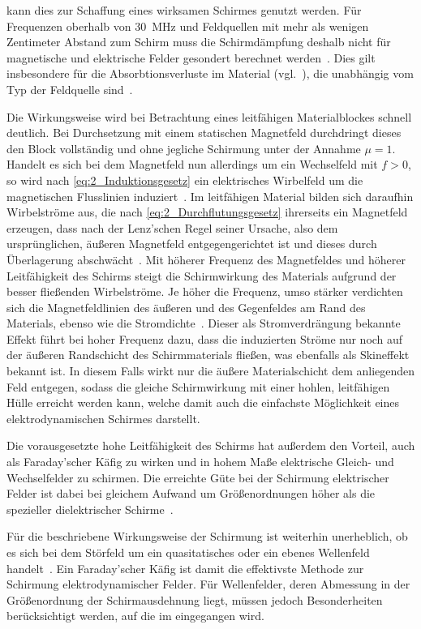 kann dies zur Schaffung eines wirksamen Schirmes genutzt werden. Für Frequenzen oberhalb von \SI{30}{\mega\hertz} und Feldquellen mit mehr als wenigen Zentimeter Abstand zum Schirm muss die Schirmdämpfung deshalb nicht für magnetische und elektrische Felder gesondert berechnet werden~\cite{Design_of_shielded_enclosures}. Dies gilt insbesondere für die Absorbtionsverluste im Material (vgl.~\Abschnitt{}), die unabhängig vom Typ der Feldquelle sind~\cite{NASA_SP-3067}.   
\par 
\vspace{\linespace}
Die Wirkungsweise wird bei Betrachtung eines leitfähigen Materialblockes schnell deutlich. Bei Durchsetzung mit einem statischen Magnetfeld durchdringt dieses den Block vollständig und ohne jegliche Schirmung unter der Annahme $\mu = 1$. Handelt es sich bei dem Magnetfeld nun allerdings um ein Wechselfeld mit $f > 0$, so wird nach \Gleichung\eqref{eq:2_Induktionsgesetz} ein elektrisches Wirbelfeld um die magnetischen Flusslinien induziert~\cite{EM_Schirmung}. Im leitfähigen Material bilden sich daraufhin Wirbelströme aus, die nach \Gleichung\eqref{eq:2_Durchflutungsgesetz} ihrerseits ein Magnetfeld erzeugen, dass nach der Lenz'schen Regel seiner Ursache, also dem ursprünglichen, äußeren Magnetfeld entgegengerichtet ist und dieses durch Überlagerung abschwächt~\cite{EM_Schirmung}. Mit höherer Frequenz des Magnetfeldes und höherer Leitfähigkeit des Schirms steigt die Schirmwirkung des Materials aufgrund der besser fließenden Wirbelströme. Je höher die Frequenz, umso stärker verdichten sich die Magnetfeldlinien des äußeren und des Gegenfeldes am Rand des Materials, ebenso wie die Stromdichte~\cite{EM_Schirmung}. Dieser als Stromverdrängung bekannte Effekt führt bei hoher Frequenz dazu, dass die induzierten Ströme nur noch auf der äußeren Randschicht des Schirmmaterials fließen, was ebenfalls als Skineffekt bekannt ist. In diesem Falls wirkt nur die äußere Materialschicht dem anliegenden Feld entgegen, sodass die gleiche Schirmwirkung mit einer hohlen, leitfähigen Hülle erreicht werden kann, welche damit auch die einfachste Möglichkeit eines elektrodynamischen Schirmes darstellt. 
\par 
\vspace{\linespace}
Die vorausgesetzte hohe Leitfähigkeit des Schirms hat außerdem den Vorteil, auch als Faraday'scher Käfig zu wirken und in hohem Maße elektrische Gleich- und Wechselfelder zu schirmen. Die erreichte Güte bei der Schirmung elektrischer Felder ist dabei bei gleichem Aufwand um Größenordnungen höher als die spezieller dielektrischer Schirme~\cite{EM_Schirmung}.
\par
\vspace{\linespace}
Für die beschriebene Wirkungsweise der Schirmung ist weiterhin unerheblich, ob es sich bei dem Störfeld um ein quasitatisches oder ein ebenes Wellenfeld handelt~\cite{EM_Schirmung}. Ein Faraday'scher Käfig ist damit die effektivste Methode zur Schirmung elektrodynamischer Felder. Für Wellenfelder, deren Abmessung in der Größenordnung der Schirmausdehnung liegt, müssen jedoch Besonderheiten berücksichtigt werden, auf die im \Abschnitt{} eingegangen wird.  


